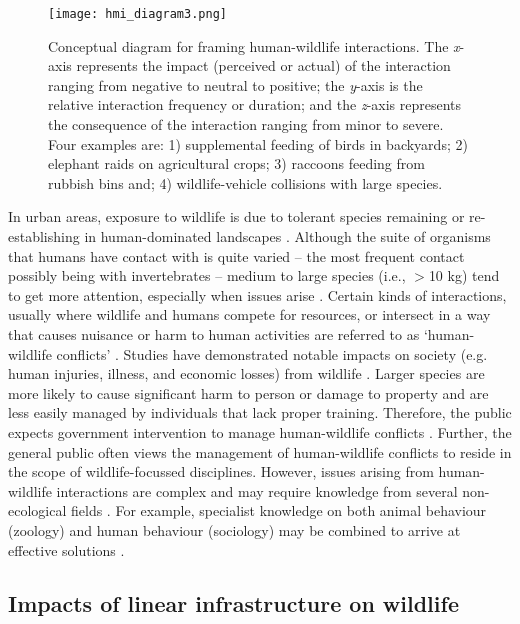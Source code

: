 \begin{figure*}[!t]
  \centering
  \texttt{[image: hmi\_diagram3.png]}
  \caption[Conceptual diagram for framing human-wildlife interactions]{Conceptual diagram for framing human-wildlife interactions. The \textit{x}-axis represents the impact (perceived or actual) of the interaction ranging from negative to neutral to positive; the \textit{y}-axis is the relative interaction frequency or duration; and the \textit{z}-axis represents the consequence of the interaction ranging from minor to severe. Four examples are: 1) supplemental feeding of birds in backyards; 2) elephant raids on agricultural crops; 3) raccoons feeding from rubbish bins and; 4) wildlife-vehicle collisions with large species.}
  \label{hmi_diagram}
\end{figure*}

In urban areas, exposure to wildlife is due to tolerant species remaining or re-establishing in human-dominated landscapes \citep{soul16}. Although the suite of organisms that humans have contact with is quite varied -- the most frequent contact possibly being with invertebrates -- medium to large species (i.e., $>$10 kg) tend to get more attention, especially when issues arise \citep{seor16}. Certain kinds of interactions, usually where wildlife and humans compete for resources, or intersect in a way that causes nuisance or harm to human activities are referred to as `human-wildlife conflicts' \citep[but see][]{pete10}. Studies have demonstrated notable impacts on society (e.g. human injuries, illness, and economic losses) from wildlife \citep[e.g.][]{cono95}. Larger species are more likely to cause significant harm to person or damage to property \citep{cono01} and are less easily managed by individuals that lack proper training. Therefore, the public expects government intervention to manage human-wildlife conflicts \citep{reit99}. Further, the general public often views the management of human-wildlife conflicts to reside in the scope of wildlife-focussed disciplines. However, issues arising from human-wildlife interactions are complex and may require knowledge from several non-ecological fields \citep{deck97,madd04}. For example, specialist knowledge on both animal behaviour (zoology) and human behaviour (sociology) may be combined to arrive at effective solutions \citep{dicka10}.

\subsection{Impacts of linear infrastructure on wildlife}

